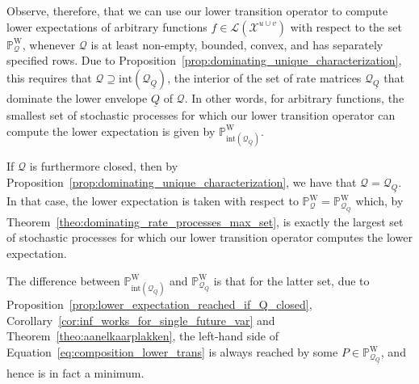 \documentclass[10pt]{paper}
\theoremstyle{definition}
\newcommand{\states}{\mathcal{X}}
\newcommand{\processes}{\mathbb{P}}
\newcommand{\wprocesses}{\processes^{\mathrm{W}}}
\newcommand{\gambles}{\mathcal{L}}
\newcommand{\rateset}{\mathcal{Q}}
\newcommand{\lrate}{\underline{Q}}
\begin{document}
Observe, therefore, that we can use our lower transition operator to compute lower expectations of arbitrary functions $f\in\gambles(\states^{u\cup v})$ with respect to the set $\wprocesses_\rateset$, whenever $\rateset$ is at least non-empty, bounded, convex, and has separately specified rows. Due to Proposition~\ref{prop:dominating_unique_characterization}, this requires that $\rateset\supseteq\text{int}(\rateset_{\lrate})$, the interior of the set of rate matrices $\rateset_{\lrate}$ that dominate the lower envelope $\lrate$ of $\rateset$. In other words, for arbitrary functions, the smallest set of stochastic processes for which our lower transition operator can compute the lower expectation is given by $\wprocesses_{\text{int}(\rateset_{\lrate})}$.

If $\rateset$ is furthermore closed, then by Proposition~\ref{prop:dominating_unique_characterization}, we have that $\rateset=\rateset_{\lrate}$. In that case, the lower expectation is taken with respect to $\wprocesses_\rateset=\wprocesses_{\rateset_{\lrate}}$ which, by Theorem~\ref{theo:dominating_rate_processes_max_set}, is exactly the largest set of stochastic processes for which our lower transition operator computes the lower expectation.

The difference between $\wprocesses_{\text{int}(\rateset_{\lrate})}$ and $\wprocesses_{\rateset_{\lrate}}$ is that for the latter set, due to Proposition~\ref{prop:lower_expectation_reached_if_Q_closed}, Corollary~\ref{cor:inf_works_for_single_future_var} and Theorem~\ref{theo:aanelkaarplakken}, the left-hand side of Equation~\eqref{eq:composition_lower_trans} is always reached by some $P\in\wprocesses_{\rateset_{\lrate}}$, and hence is in fact a minimum.
\end{document}
